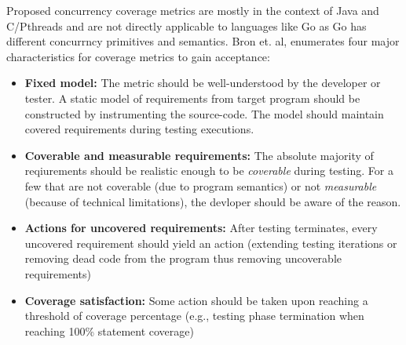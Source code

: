 Proposed concurrency coverage metrics are mostly in the context of Java and C/Pthreads and are not directly applicable to languages like Go as Go has different concurrncy primitives and semantics.
%
Bron et. al,\cite{bron-appSyncCov-ppopp05} enumerates four major characteristics for coverage metrics to gain acceptance:
\begin{itemize}
  \item \textbf{Fixed model:} The metric should be well-understood by the developer or tester. A static model of requirements from target program should be constructed by instrumenting the source-code. The model should maintain covered requirements during testing executions.
  \item \textbf{Coverable and measurable requirements:} The absolute majority of reqiurements should be realistic enough to be \textit{coverable} during testing. For a few that are not coverable (due to program semantics) or not \textit{measurable} (because of technical limitations), the devloper should be aware of the reason.
  \item \textbf{Actions for uncovered requirements:} After testing terminates, every uncovered requirement should yield an action (\eg extending testing iterations or removing dead code from the program thus removing uncoverable requirements)
  \item \textbf{Coverage satisfaction:} Some action should be taken upon reaching a threshold of coverage percentage (e.g., testing phase termination when reaching 100\% statement coverage)
\end{itemize}

